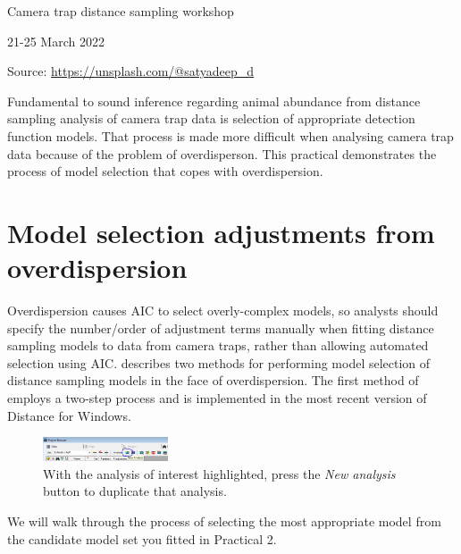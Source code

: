 \documentclass[a4paper, 10pt]{article}
\begin{document}
\phantom{a}

\vspace{4.7cm}

{\Large Camera trap distance sampling workshop}

{\large 21-25 March 2022}

\begin{flushright}
\tiny{Source: \url{https://unsplash.com/@satyadeep_d}}
\end{flushright}

%
{%
}

Fundamental to sound inference regarding animal abundance from distance sampling analysis of camera trap data is selection of appropriate detection function models.  That process is made more difficult when analysing camera trap data because of the problem of overdisperson.  This practical demonstrates the process of model selection that copes with overdispersion.

\section{Model selection adjustments from overdispersion}

Overdispersion causes AIC to select overly-complex models, so analysts should specify the number/order of adjustment terms manually when fitting distance sampling models to data from camera traps, rather than allowing automated selection using AIC. \textcite{howe_model_2019} describes two methods for performing model selection of distance sampling models in the face of overdispersion.  The first method of \textcite{howe_model_2019} employs a two-step process and is implemented in the most recent version of Distance for Windows. 

\begin{figure}
\includegraphics[width=0.33\textwidth]{images/new.png}
\caption{With the analysis of interest highlighted, press the \emph{New analysis} button to duplicate that analysis. \label{fig:newa}}
\vspace{-25pt}
\end{figure}

We will walk through the process of selecting the most appropriate model from the candidate model set you fitted in Practical 2.
\end{document}
